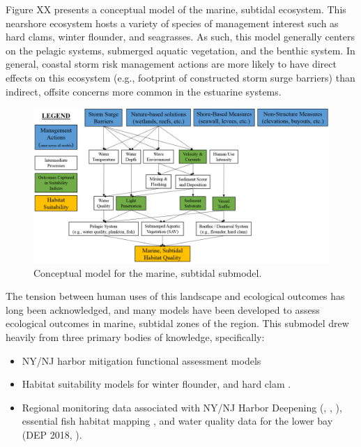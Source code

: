 \documentclass[
]{book}
\begin{document}
Figure XX presents a conceptual model of the marine, subtidal ecosystem. This nearshore ecosystem hosts a variety of species of management interest such as hard clams, winter flounder, and seagrasses. As such, this model generally centers on the pelagic systems, submerged aquatic vegetation, and the benthic system. In general, coastal storm risk management actions are more likely to have direct effects on this ecosystem (e.g., footprint of constructed storm surge barriers) than indirect, offsite concerns more common in the estuarine systems.

\begin{figure}
\includegraphics[width=43.89in]{ZZ_Fig04.12_Mar.Sub_ConModel} \caption{Conceptual model for the marine, subtidal submodel.}\label{fig:unnamed-chunk-21}
\end{figure}

The tension between human uses of this landscape and ecological outcomes has long been acknowledged, and many models have been developed to assess ecological outcomes in marine, subtidal zones of the region. This submodel drew heavily from three primary bodies of knowledge, specifically:

\begin{itemize}
\item
  NY/NJ harbor mitigation functional assessment models \citep{usace_new_2000}
\item
  Habitat suitability models for winter flounder\citep{banner_usfws_2001}, and hard clam \citep{mulholland_habitat_1984-1}.
\item
  Regional monitoring data associated with NY/NJ Harbor Deepening (\citet{usace_application_2012}, \citet{usace_demersal_2015a}, \citet{usace_dredge_2015b}), essential fish habitat mapping \citep{usace_essential_2013}, and water quality data for the lower bay (DEP 2018, \citet{usace_dredge_2015b}).
\end{itemize}
\end{document}
